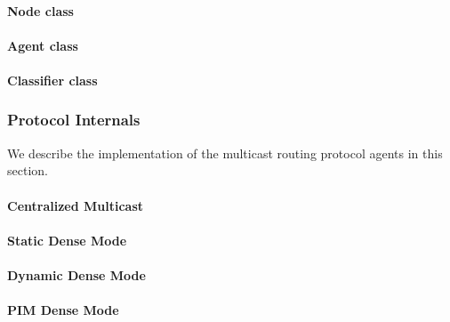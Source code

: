 \documentclass{article}
\begin{document}
\paragraph{Node class}

\paragraph{Agent class}

\paragraph{Classifier class}

\subsubsection{Protocol Internals}
\label{sec:mcastproto-internals}

We describe the implementation of the
multicast routing protocol agents in this section.

\paragraph{Centralized Multicast}

\paragraph{Static Dense Mode}

\paragraph{Dynamic Dense Mode}

\paragraph{PIM Dense Mode}
\end{document}
